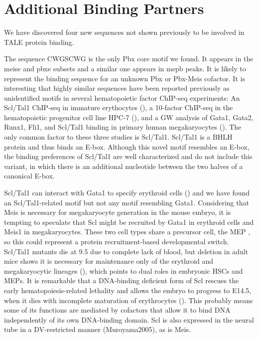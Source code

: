 \section{Additional Binding Partners}

We have discovered four new sequences not shown previously to be involved in \ac{TALE} protein binding. 

The sequence CWGSCWG is the only Pbx core motif we found. It appears in the \ac{meise} and \ac{pbxe} subsets and a similar one appears in \ac{mepb} peaks. It is likely to represent the binding sequence for an unknown Pbx or Pbx-Meis cofactor. It is interesting that highly similar sequences have been reported previously as unidentified motifs in several hematopoietic factor ChIP-seq experiments: An Scl/Tal1 ChIP-seq in immature erythocytes (\cite{Kassouf2010}), a 10-factor ChIP-seq in the hematopoietic progenitor cell line HPC-7 (\cite{Wilson2010}), and a \ac{GW} analysis of Gata1, Gata2, Runx1, Fli1, and Scl/Tal1 binding in primary human megakaryocytes (\cite{Tijssen2011}). The only common factor to these three studies is Scl/Tal1. Scl/Tal1 is a \ac{BHLH} protein and thus binds an E-box. Although this novel motif resembles an E-box, the binding preferences of Scl/Tal1 are well characterized and do not include this variant, in which there is an additional nucleotide between the two halves of a canonical E-box. %

Scl/Tal1 can interact with Gata1 to specify erythroid cells (\cite{Lahlil2004}) and we have found an Scl/Tal1-related motif but not any motif resembling Gata1. Considering that Meis is necessary for megakaryocyte generation in the mouse embryo, it is tempting to speculate that Scl might be recruited by Gata1 in erythroid cells \parencite{Anguita2004} and Meis1 in megakaryocytes. These two cell types share a precursor cell, the \ac{MEP} \parencite{Dore2011}, so this could represent a protein recruitment-based developmental switch. Scl/Tal1 mutants die at 9.5 due to complete lack of blood, but deletion in adult mice shows it is necessary for maintenance only of the erythroid and megakaryocytic lineages (\cite{Mikkola2003}), which points to dual roles in embryonic \acp{HSC} and \acp{MEP}. It is remarkable that a DNA-binding deficient form of Scl rescues the early hematopoiesis-related lethality and allows the embryo to progress to E14.5, when it dies with incomplete maturation of erythrocytes (\cite{Porcher1999, Kassouf2008}). This probably means some of its functions are mediated by cofactors that allow it to bind DNA independently of its own DNA-binding domain. Scl is also expressed in the neural tube in a \ac{DV}-restricted manner (Muroyama2005), as is Meis.



